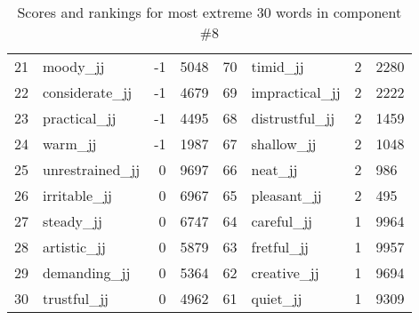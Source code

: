 \begin{table}[tbp]
\begin{tabular}{| rlr@{.}l | rlr@{.}l |}
    21 & moody\_jj & -1 & 5048    &    70 & timid\_jj & 2 & 2280 \\
    22 & considerate\_jj & -1 & 4679    &    69 & impractical\_jj & 2 & 2222 \\
    23 & practical\_jj & -1 & 4495    &    68 & distrustful\_jj & 2 & 1459 \\
    24 & warm\_jj & -1 & 1987    &    67 & shallow\_jj & 2 & 1048 \\
    25 & unrestrained\_jj & 0 & 9697    &    66 & neat\_jj & 2 & 986 \\
    26 & irritable\_jj & 0 & 6967    &    65 & pleasant\_jj & 2 & 495 \\
    27 & steady\_jj & 0 & 6747    &    64 & careful\_jj & 1 & 9964 \\
    28 & artistic\_jj & 0 & 5879    &    63 & fretful\_jj & 1 & 9957 \\
    29 & demanding\_jj & 0 & 5364    &    62 & creative\_jj & 1 & 9694 \\
    30 & trustful\_jj & 0 & 4962    &    61 & quiet\_jj & 1 & 9309 \\
    \hline
    \end{tabular}
    \caption{Scores and rankings for most extreme 30 words in component \#8} 
\end{table}
\clearpage
